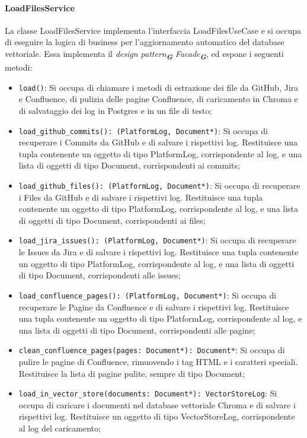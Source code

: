 \paragraph{LoadFilesService}
\label{sec:load_files_service}
La classe LoadFilesService implementa l'interfaccia LoadFilesUseCase e si occupa di eseguire la logica di business per l'aggiornamento automatico del database vettoriale. Essa implementa il \emph{design pattern}\textsubscript{\textbf{\textit{G}}} \emph{Facade}\textsubscript{\textbf{\textit{G}}}, ed espone i seguenti metodi:
\begin{itemize}
    \item \texttt{load()}: Si occupa di chiamare i metodi di estrazione dei file da GitHub, Jira e Confluence, di pulizia delle pagine Confluence, di caricamento in Chroma e di salvataggio dei log in Postgres e in un file di testo;
    \item \texttt{load\_github\_commits(): (PlatformLog, Document*)}: Si occupa di recuperare i Commits da GitHub e di salvare i rispettivi log. Restituisce una tupla contenente un oggetto di tipo PlatformLog, corrispondente al log, e una lista di oggetti di tipo Document, corrispondenti ai commits;
    \item \texttt{load\_github\_files(): (PlatformLog, Document*)}: Si occupa di recuperare i Files da GitHub e di salvare i rispettivi log. Restituisce una tupla contenente un oggetto di tipo PlatformLog, corrispondente al log, e una lista di oggetti di tipo Document, corrispondenti ai files;
    \item \texttt{load\_jira\_issues(): (PlatformLog, Document*)}: Si occupa di recuperare le Issues da Jira e di salvare i rispettivi log. Restituisce una tupla contenente un oggetto di tipo PlatformLog, corrispondente al log, e una lista di oggetti di tipo Document, corrispondenti alle issues;
    \item \texttt{load\_confluence\_pages(): (PlatformLog, Document*)}: Si occupa di recuperare le Pagine da Confluence e di salvare i rispettivi log. Restituisce una tupla contenente un oggetto di tipo PlatformLog, corrispondente al log, e una lista di oggetti di tipo Document, corrispondenti alle pagine;
    \item \texttt{clean\_confluence\_pages(pages: Document*): Document*}: Si occupa di pulire le pagine di Confluence, rimuovendo i tag HTML e i caratteri speciali. Restituisce la lista di pagine pulite, sempre di tipo Document;
    \item \texttt{load\_in\_vector\_store(documents: Document*): VectorStoreLog}: Si occupa di caricare i documenti nel database vettoriale Chroma e di salvare i rispettivi log. Restituisce un oggetto di tipo VectorStoreLog, corrispondente al log del caricamento;

\end{itemize}
